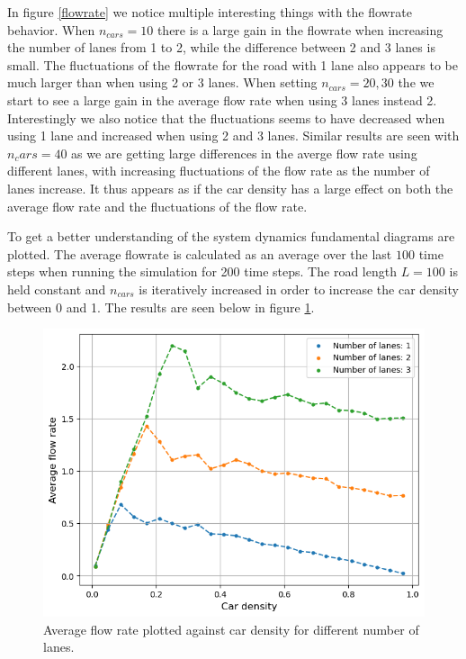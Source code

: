 \documentclass[a4paper,12pt]{article}
\begin{document}
In figure \ref*{flowrate} we notice multiple interesting things with the flowrate behavior. When $n_{cars}=10$ there is a large gain in the flowrate when increasing
the number of lanes from 1 to 2, while the difference between 2 and 3 lanes is small. The fluctuations of the flowrate for the road with 1 lane also
appears to be much larger than when using 2 or 3 lanes. When setting $n_{cars}=20, 30$ the we start to see a large gain in the average flow rate when using 3 lanes instead 2.
Interestingly we also notice that the fluctuations seems to have decreased when using 1 lane and increased when using 2 and 3 lanes. Similar results are seen with $n_cars = 40$
as we are getting large differences in the averge flow rate using different lanes, with increasing fluctuations of the flow rate as the number of lanes increase.
It thus appears as if the car density has a large effect on both the average flow rate and the fluctuations of the flow rate.

To get a better understanding of the system dynamics fundamental diagrams are plotted. The average flowrate is calculated as an average over the last $100$ time steps when running
the simulation for 200 time steps. The road length $L=100$ is held constant and $n_{cars}$ is iteratively
increased in order to increase the car density between 0 and 1. The results are seen below in figure \ref*{fundamental diagram}.

\begin{figure}[H]
    \centering
    \includegraphics[scale=0.9]{Images/fundamental diagram.png}
    \caption{Average flow rate plotted against car density for different number of lanes.}
    \label{fundamental diagram}
\end{figure}
\end{document}
